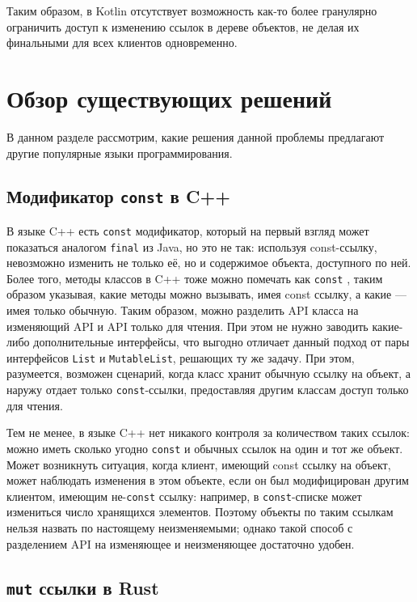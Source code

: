 \documentclass[specification,annotation,times]{itmo-student-thesis}
\begin{document}
Таким образом, в Kotlin отсутствует возможность как-то более гранулярно ограничить доступ к изменению ссылок в дереве объектов, не 
делая их финальными для всех клиентов одновременно.

\section{Обзор существующих решений}
\startrelatedwork

В данном разделе рассмотрим, какие решения данной проблемы предлагают другие популярные языки программирования.

\subsection{Модификатор \texttt{const} в C++}

В языке C++ есть \texttt{const} модификатор, который на первый взгляд может показаться аналогом \texttt{final} из Java, но это не так: используя const-ссылку, невозможно изменить не только её, но и содержимое объекта, доступного по ней. Более того, методы классов в C++ тоже можно помечать как \texttt{const} \cite{cpp-const}, таким образом указывая, какие методы можно вызывать, имея const ссылку, а какие --- имея только обычную.
Таким образом, можно разделить API класса на изменяющий API и API только для чтения. При этом не нужно заводить какие-либо дополнительные интерфейсы, что выгодно отличает данный подход от пары интерфейсов \texttt{List} и \texttt{MutableList}, решающих ту же задачу.
При этом, разумеется, возможен сценарий, когда класс хранит обычную ссылку на объект, а наружу отдает только \texttt{const}-ссылки, предоставляя другим классам доступ только для чтения.

Тем не менее, в языке C++ нет никакого контроля за количеством таких ссылок: можно иметь сколько угодно \texttt{const} и обычных ссылок на один и тот же объект. Может возникнуть ситуация, когда клиент, имеющий const ссылку на объект, может наблюдать изменения в этом объекте, если он был модифицирован другим клиентом, имеющим не-\texttt{const} ссылку: например, в \texttt{const}-списке может измениться число хранящихся элементов.
Поэтому объекты по таким ссылкам нельзя назвать по настоящему неизменяемыми; однако такой способ с разделением API на изменяющее и неизменяющее достаточно удобен.

\subsection{\texttt{mut} ссылки в Rust}
\end{document}
